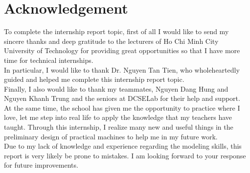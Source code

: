 \documentclass{presets}
\begin{document}
	\chapter*{Acknowledgement}
	To complete the internship report topic, first of all I would like to send my sincere thanks and deep gratitude to the lecturers of Ho Chi Minh City University of Technology for providing great opportunities so that I have more time for technical internships. \\
	In particular, I would like to thank Dr. Nguyen Tan Tien, who wholeheartedly guided and helped me complete this internship report topic.\\
	Finally, I also would like to thank my teammates, Nguyen Dang Hung and Nguyen Khanh Trung and the seniors at DCSELab for their help and support.\\
	At the same time, the school has given me the opportunity to practice where I love, let me step into real life to apply the knowledge that my teachers have taught. Through this internship, I realize many new and useful things in the preliminary design of practical machines to help me in my future work.\\
	Due to my lack of knowledge and experience regarding the modeling skills, this report is very likely be prone to mistakes. I am looking forward to your response for future improvements.
	
	
	
	
\end{document}
